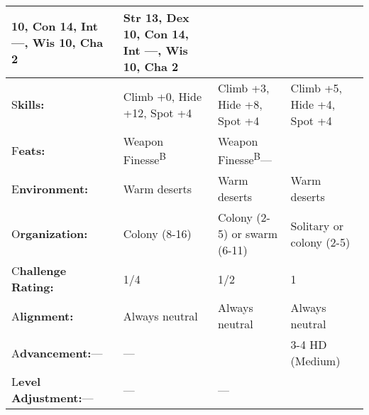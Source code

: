 \documentclass{article}
\begin{document}
\begin{tabular}{|>{\raggedright}p{52pt}|>{\raggedright}p{84pt}|>{\raggedright}p{84pt}|>{\raggedright}p{81pt}|}
10, Con 14, Int ---, Wis 10, Cha 2 & Str 13, Dex 10, Con 14, Int ---, Wis 10, Cha 
2\tabularnewline
\hline
S\textbf{kills:} & Climb +0, Hide +12, Spot +4 & Climb +3, Hide +8, Spot +4 & Climb 
+5, Hide +4, Spot +4\tabularnewline
\hline
F\textbf{eats:} & Weapon Finesse\textsuperscript{B} & Weapon Finesse\textsuperscript{B}--- & \tabularnewline
\hline
E\textbf{nvironment:} & Warm deserts & Warm deserts & Warm deserts\tabularnewline
\hline
O\textbf{rganization:} & Colony (8-16) & Colony (2-5) or swarm (6-11) & Solitary 
or colony (2-5)\tabularnewline
\hline
C\textbf{hallenge Rating:} & 1/4 & 1/2 & 1\tabularnewline
\hline
A\textbf{lignment:} & Always neutral & Always neutral & Always neutral\tabularnewline
\hline
A\textbf{dvancement:}--- & --- &  & 3-4 HD (Medium)\tabularnewline
\hline
L\textbf{evel Adjustment:}--- & --- & --- & \tabularnewline
\hline
\end{tabular}
\end{document}
